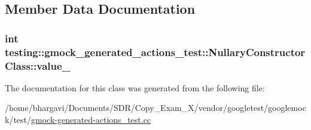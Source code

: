\subsection{Member Data Documentation}
\subsubsection[{\texorpdfstring{value\+\_\+}{value_}}]{\setlength{\rightskip}{0pt plus 5cm}int testing\+::gmock\+\_\+generated\+\_\+actions\+\_\+test\+::\+Nullary\+Constructor\+Class\+::value\+\_\+}\hypertarget{classtesting_1_1gmock__generated__actions__test_1_1_nullary_constructor_class_aa877ccc5aff335cbf81b8de90abee732}{}\label{classtesting_1_1gmock__generated__actions__test_1_1_nullary_constructor_class_aa877ccc5aff335cbf81b8de90abee732}


The documentation for this class was generated from the following file\+:\begin{DoxyCompactItemize}
\item 
/home/bhargavi/\+Documents/\+S\+D\+R/\+Copy\+\_\+\+Exam\+\_\+X/vendor/googletest/googlemock/test/\hyperlink{gmock-generated-actions__test_8cc}{gmock-\/generated-\/actions\+\_\+test.\+cc}\end{DoxyCompactItemize}
